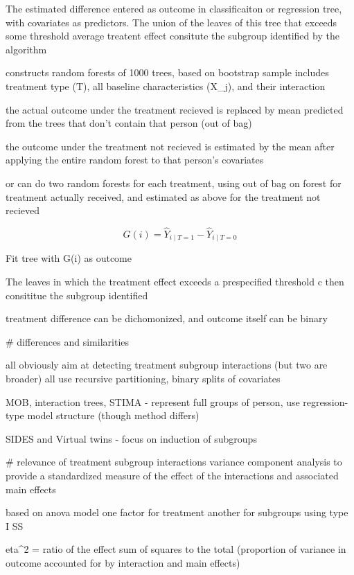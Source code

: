 \documentclass[10pt]{article}
\begin{document}
The estimated difference entered as outcome in classificaiton or regression tree, with covariates as predictors.
The union of the leaves of this tree that exceeds some threshold average treatent effect consitute the subgroup identified by the algorithm

constructs random forests of 1000 trees,
based on bootstrap sample
includes treatment type (T), all baseline characteristics (X_j), and their interaction

the actual outcome under the treatment recieved is replaced by mean predicted from the trees that don't contain that person (out of bag)

the outcome under the treatment not recieved is estimated by the mean after applying the entire random forest to that person's covariates

or can do two random forests for each treatment, using out of bag on forest for treatment actually received, and estimated as above for the treatment not recieved

$$
G(i) = \hat{Y}_{i \mid T = 1} - \hat{Y}_{i \mid T = 0}
$$

Fit tree with G(i) as outcome

The leaves in which the treatment effect exceeds a prespecified threshold c then consititue the subgroup identified

treatment difference can be dichomonized, and outcome itself can be binary


# differences and similarities

all obviously aim at detecting treatment subgroup interactions (but two are broader)
all use recursive partitioning, binary splits of covariates

MOB, interaction trees, STIMA - represent full groups of person, use regression-type model structure (though method differs)

SIDES and Virtual twins - focus on induction of subgroups

# relevance of treatment subgroup interactions
variance component analysis to provide a standardized measure of the effect of the interactions and associated main effects

based on anova model one factor for treatment another for subgroups using type I SS

eta^2 = ratio of the effect sum of squares to the total (proportion of variance in outcome accounted for by interaction and main effects)

\end{document}
